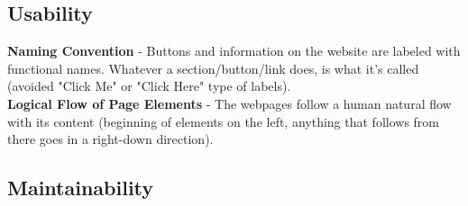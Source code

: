 \subsection{Usability}
\par{\textbf{Naming Convention} - Buttons and information on the website are labeled with functional names. Whatever a section/button/link does, is what it's called (avoided "Click Me" or "Click Here" type of labels). \\\textbf{Logical Flow of Page Elements} - The webpages follow a human natural flow with its content (beginning of elements on the left, anything that follows from there goes in a right-down direction). }

\subsection{Maintainability}